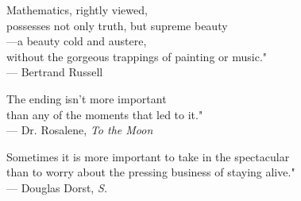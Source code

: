 
\singlespacing
\par{Mathematics, rightly viewed,\\ 
						      possesses not only truth, but supreme beauty\\ 
							  ---a beauty cold and austere,\\
							  without the gorgeous trappings of painting or music.{\large "}\\ \vspace{0.2cm}
									    --- Bertrand Russell	\par}
\vspace{1cm}
\par{The ending isn't more important\\ 
						      than any of the moments that led to it.{\large "}\\ \vspace{0.2cm}
									    --- Dr. Rosalene, \textit{To the Moon}	\par}

\vspace{1cm}
\par{Sometimes it is more important to take in the spectacular\\ 
						      than to worry about the pressing business of staying alive.{\large "}\\ \vspace{0.2cm}
									    --- Douglas Dorst, \textit{S.}	\par}

\doublespacing